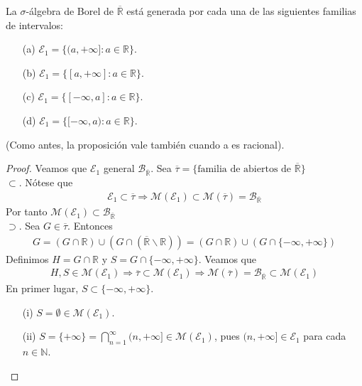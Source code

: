 \begin{prop}
La $\sigma$-álgebra de Borel de $\overline{\mathbb{R}}$ está generada por cada una de las siguientes familias de intervalos:
\begin{enumerate}
    \item[(a)] $\mathcal{E}_1 = \{ (a, +\infty] : a \in \mathbb{R}\}$.
    \item[(b)] $\mathcal{E}_1 = \{ [a, +\infty] : a \in \mathbb{R}\}$.
    \item[(c)] $\mathcal{E}_1 = \{ [-\infty, a] : a \in \mathbb{R}\}$.
    \item[(d)] $\mathcal{E}_1 = \{ [-\infty, a) : a \in \mathbb{R}\}$.
\end{enumerate}
(Como antes, la proposición vale también cuando a es racional).
\end{prop}
\begin{proof}
Veamos que $\mathcal{E}_1$ general $\mathcal{B}_{\overline{\mathbb{R}}}$. Sea $\overline{\tau} = \{ \text{familia de abiertos de } \overline{\mathbb{R}}\}$
\\
\newline
$\subset$. Nótese que 
\begin{align*}
    \mathcal{E}_1 \subset \overline{\tau} \Longrightarrow \mathcal{M}(\mathcal{E}_1) \subset \mathcal{M}(\overline{\tau}) = \mathcal{B}_{\overline{\mathbb{R}}}
\end{align*}
Por tanto $\mathcal{M}(\mathcal{E}_1) \subset \mathcal{B}_{\overline{\mathbb{R}}}$
\\
\newline
$\supset$. Sea $G \in \overline{\tau}$. Entonces
\begin{align*}
    G = (G \cap \mathbb{R}) \cup (G \cap (\overline{\mathbb{R}} \backslash \mathbb{R})) = (G \cap \mathbb{R}) \cup (G \cap \{ -\infty, +\infty \})
\end{align*}
Definimos $H = G \cap \mathbb{R}$ y $S = G \cap \{ -\infty, +\infty \}$. Veamos que
\begin{align*}
    H,S \in \mathcal{M}(\mathcal{E}_1) \Longrightarrow \overline{\tau} \subset \mathcal{M}(\mathcal{E}_1) \Longrightarrow \mathcal{M}(\overline{\tau}) = \mathcal{B}_{\overline{\mathbb{R}}} \subset \mathcal{M}(\mathcal{E}_1)
\end{align*}
En primer lugar, $S \subset \{ -\infty, +\infty \}$.
\begin{enumerate}
    \item[(i)] $S = \emptyset \in \mathcal{M}(\mathcal{E}_1)$.
    \item[(ii)] $S = \{ +\infty \} = \bigcap_{n=1}^{\infty}{(n, +\infty]} \in \mathcal{M}(\mathcal{E}_1)$, pues $(n, +\infty] \in \mathcal{E}_1$ para cada $n \in \mathbb{N}$.

\end{enumerate}
\end{proof}
